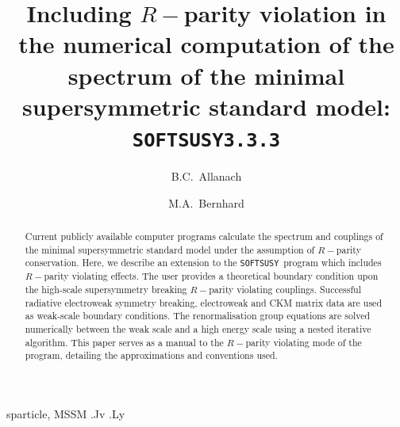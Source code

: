 \documentclass[final,3p,times,pdflatex]{elsarticle}
\def\SOFTSUSY{{\tt SOFTSUSY}}
\begin{document}
\begin{frontmatter}

\title{Including $R-$parity violation in the numerical computation of the
  spectrum of the minimal supersymmetric standard model: \SOFTSUSY{\tt 3.3.3}}

\author{B.C.~Allanach}
\address{DAMTP, CMS, University of Cambridge, Wilberforce road, Cambridge, CB3
  0WA, United Kingdom}

\author{M.A.~Bernhard}
\address{Physics Institute, University of Bonn, Nussallee 12, D-53115 Bonn,
Germany}
\begin{abstract}
Current publicly available computer programs calculate the
spectrum and couplings of the
  minimal supersymmetric standard model under the
  assumption of   $R-$parity conservation. Here, we describe an extension to the
  {\tt SOFTSUSY}~program which includes $R-$parity violating effects.
  The user provides a theoretical boundary
  condition upon the high-scale 
  supersymmetry breaking $R-$parity violating couplings.
  Successful radiative electroweak symmetry breaking,
   electroweak and CKM matrix data are used
  as weak-scale boundary conditions. 
  The renormalisation group equations are solved
  numerically between the weak scale and a high energy scale using a nested
  iterative algorithm. 
  This paper serves as a manual to the
  $R-$parity violating mode of the program, detailing the approximations and
  conventions used. 
\end{abstract}

\begin{keyword}
sparticle, 
MSSM
.Jv
.Ly
\end{keyword}
\end{frontmatter}
\end{document}
